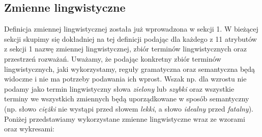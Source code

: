 \documentclass{classrep}
\begin{document}
\subsection{Zmienne lingwistyczne}
Definicja zmiennej lingwistycznej została już wprowadzona w sekcji 1. W bieżącej sekcji skupimy się dokładniej na tej definicji podając dla każdego z 11 atrybutów z sekcji 1 nazwę zmiennej lingwistycznej, zbiór terminów lingwistycznych oraz przestrzeń rozważań. Uważamy, że podając konkretny zbiór terminów lingwistycznych, jaki wykorzystamy, reguły gramatyczna oraz semantyczna będą widoczne i nie ma potrzeby podawania ich wprost. Wszak np. dla wzrostu nie podamy jako termin lingwistyczny słowa \textit{zielony} lub \textit{szybki} oraz wszystkie terminy we wszystkich zmiennych będą uporządkowane w sposób semantyczny (np. słowo \textit{ciężki} nie wystąpi przed słowem \textit{lekki}, a słowo \textit{idealny} przed \textit{fatalny}). Poniżej przedstawiamy wykorzystane zmienne lingwistyczne wraz ze wzorami oraz wykresami:
\end{document}
